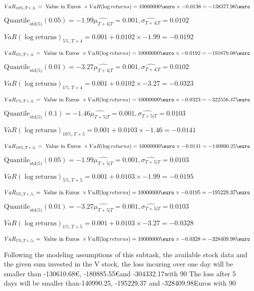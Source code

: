 $VaR_{10\%, T + ,4,} = \text{ Value in Euros } \times VaR(\log returns) = 10 000 000 \text{\euro} \times-0.0138 = -138377.96 \text{\euro}$


$\text{Quantile}_\text{std(5)}(0.05) = -1.99$$\hat{\mu_{T+4|T}} = 0.001, \hat{\sigma_{T+4|T}} = 0.0102$

$VaR(\log \text{returns})_{5\%, T + 4} = 0.001 + 0.0102\times-1.99 = -0.0192$

$VaR_{5\%, T + ,4,} = \text{ Value in Euros } \times VaR(\log returns) = 10 000 000 \text{\euro} \times-0.0192 = -191679.08 \text{\euro}$


$\text{Quantile}_\text{std(5)}(0.01) = -3.27$$\hat{\mu_{T+4|T}} = 0.001, \hat{\sigma_{T+4|T}} = 0.0102$

$VaR(\log \text{returns})_{1\%, T + 4} = 0.001 + 0.0102\times-3.27 = -0.0323$

$VaR_{1\%, T + ,4,} = \text{ Value in Euros } \times VaR(\log returns) = 10 000 000 \text{\euro} \times-0.0323 = -322556.47 \text{\euro}$


$\text{Quantile}_\text{std(5)}(0.1) = -1.46$$\hat{\mu_{T+5|T}} = 0.001, \hat{\sigma_{T+5|T}} = 0.0103$

$VaR(\log \text{returns})_{10\%, T + 5} = 0.001 + 0.0103\times-1.46 = -0.0141$

$VaR_{10\%, T + ,5,} = \text{ Value in Euros } \times VaR(\log returns) = 10 000 000 \text{\euro} \times-0.0141 = -140990.25 \text{\euro}$


$\text{Quantile}_\text{std(5)}(0.05) = -1.99$$\hat{\mu_{T+5|T}} = 0.001, \hat{\sigma_{T+5|T}} = 0.0103$

$VaR(\log \text{returns})_{5\%, T + 5} = 0.001 + 0.0103\times-1.99 = -0.0195$

$VaR_{5\%, T + ,5,} = \text{ Value in Euros } \times VaR(\log returns) = 10 000 000 \text{\euro} \times-0.0195 = -195229.37 \text{\euro}$


$\text{Quantile}_\text{std(5)}(0.01) = -3.27$$\hat{\mu_{T+5|T}} = 0.001, \hat{\sigma_{T+5|T}} = 0.0103$

$VaR(\log \text{returns})_{1\%, T + 5} = 0.001 + 0.0103\times-3.27 = -0.0328$

$VaR_{1\%, T + ,5,} = \text{ Value in Euros } \times VaR(\log returns) = 10 000 000 \text{\euro} \times-0.0328 = -328409.98 \text{\euro}$


Following the modeling assumptions of this subtask, the available stock data and the given sum invested in the V stock, the loss incuring over one day will be smaller than -130610.68\euro, -180885.55\euro and -304332.17\euroEuros with 90%
The loss after 5 days will be smaller than-140990.25, -195229.37 and -328409.98Euros with 90%



